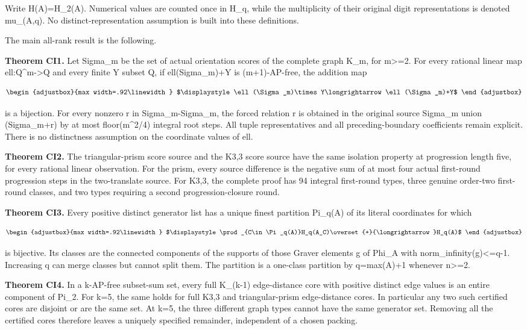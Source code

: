 Write H(A)=H\_2(A). Numerical values are counted once in H\_q, while the multiplicity of their original digit representations is denoted mu\_(A,q). No distinct-representation assumption is built into these definitions.

The main all-rank result is the following.

\textbf{Theorem CI1.} Let Sigma\_m be the set of actual orientation scores of the complete graph K\_m, for m\textgreater=2. For every rational linear map ell:Q\^{}m-\textgreater Q and every finite Y subset Q, if ell(Sigma\_m)+Y is (m+1)-AP-free, the addition map

\[
\begin{adjustbox}{max width=.92\linewidth}
$\displaystyle \ell(\Sigma_m)\times Y\longrightarrow\ell(\Sigma_m)+Y$
\end{adjustbox}
\]

is a bijection. For every nonzero r in Sigma\_m-Sigma\_m, the forced relation r is obtained in the original source Sigma\_m union (Sigma\_m+r) by at most floor(m\^{}2/4) integral root steps. All tuple representatives and all preceding-boundary coefficients remain explicit. There is no distinctness assumption on the coordinate values of ell.

\textbf{Theorem CI2.} The triangular-prism score source and the K3,3 score source have the same isolation property at progression length five, for every rational linear observation. For the prism, every source difference is the negative sum of at most four actual first-round progression steps in the two-translate source. For K3,3, the complete proof has 94 integral first-round types, three genuine order-two first-round classes, and two types requiring a second progression-closure round.

\textbf{Theorem CI3.} Every positive distinct generator list has a unique finest partition Pi\_q(A) of its literal coordinates for which

\[
\begin{adjustbox}{max width=.92\linewidth}
$\displaystyle \prod_{C\in\Pi_q(A)}H_q(A_C)\overset{+}{\longrightarrow}H_q(A)$
\end{adjustbox}
\]

is bijective. Its classes are the connected components of the supports of those Graver elements g of Phi\_A with norm\_infinity(g)\textless=q-1. Increasing q can merge classes but cannot split them. The partition is a one-class partition by q=max(A)+1 whenever n\textgreater=2.

\textbf{Theorem CI4.} In a k-AP-free subset-sum set, every full K\_(k-1) edge-distance core with positive distinct edge values is an entire component of Pi\_2. For k=5, the same holds for full K3,3 and triangular-prism edge-distance cores. In particular any two such certified cores are disjoint or are the same set. At k=5, the three different graph types cannot have the same generator set. Removing all the certified cores therefore leaves a uniquely specified remainder, independent of a chosen packing.


